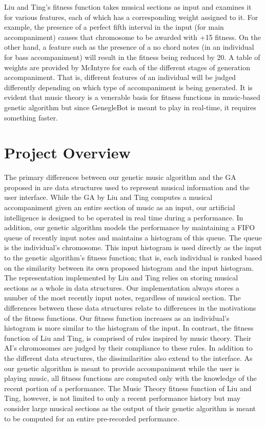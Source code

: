 \documentclass[conference]{IEEEtran}
\begin{document}
Liu and Ting’s fitness function takes musical sections as input and examines it for various features, each of which has a corresponding weight assigned to it. For example, the presence of a perfect fifth interval in the input (for main accompaniment) causes that chromosome to be awarded with +15 fitness. On the other hand, a feature such as the presence of a no chord notes (in an individual for bass accompaniment) will result in the fitness being reduced by 20. A table of weights are provided by McIntyre for each of the different stages of generation accompaniment. That is, different features of an individual will be judged differently depending on which type of accompaniment is being generated.  It is evident that music theory is a venerable basis for fitness functions in music-based genetic algorithm but since GenegleBot is meant to play in real-time, it requires something faster.

\section{Project Overview}

The primary differences between our genetic music algorithm and the GA proposed in \cite{b1} are data structures used to represent musical information and the user interface. While the GA by Liu and Ting computes a musical accompaniment given an entire section of music as an input, our artificial intelligence is designed to be operated in real time during a performance. In addition, our genetic algorithm models the performance by maintaining a FIFO queue of recently input notes and maintains a histogram of this queue. The queue is the individual’s chromosome.  This input histogram is used directly as the input to the genetic algorithm’s fitness function; that is, each individual is ranked based on the similarity between its own proposed histogram and the input histogram.
The representation implemented by Liu and Ting relies on storing musical sections as a whole in data structures\cite{b1}.  Our implementation always stores a number of the most recently input notes, regardless of musical section. The differences between these data structures relate to differences in the motivations of the fitness functions. Our fitness function increases as an individual’s histogram is more similar to the histogram of the input. In contrast, the fitness function of Liu and Ting, is comprised of rules inspired by music theory. Their AI’s chromosomes are judged by their compliance to these rules\cite{b1}.
In addition to the different data structures, the dissimilarities also extend to the interface. As our genetic algorithm is meant to provide accompaniment while the user is playing music, all fitness functions are computed only with the knowledge of the recent portion of a performance. The Music Theory fitness function of Liu and Ting, however, is not limited to only a recent performance history but may consider large musical sections as the output of their genetic algorithm is meant to be computed for an entire pre-recorded performance. 
\end{document}
